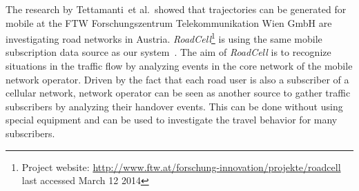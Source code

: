\documentclass[master,english]{hgbthesis}
\begin{document}
The research by Tettamanti~et al.\ showed that trajectories can be generated for mobile \cite{Valerio2009,Valerio20092} at the FTW Forschungszentrum Telekommunikation Wien GmbH are investigating road networks in Austria. \emph{RoadCell}\footnote{Project website: \url{http://www.ftw.at/forschung-innovation/projekte/roadcell} last accessed March 12 2014} is using the same mobile subscription data source as our system~\cite{RoadCell2009}. The aim of \emph{RoadCell} is to recognize situations in the traffic flow by analyzing events in the core network of the mobile network operator. Driven by the fact that each road user is also a subscriber of a cellular network, network operator can be seen as another source to gather traffic subscribers by analyzing their handover events. This can be done without using special equipment and can be used to investigate the travel behavior for many subscribers.
\end{document}
